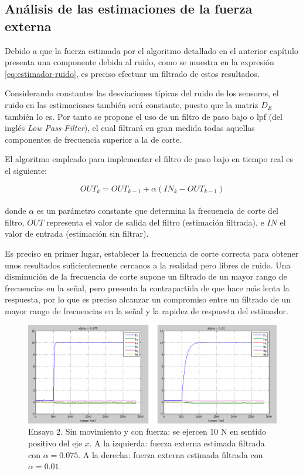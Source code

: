 \subsection{Análisis de las estimaciones de la fuerza externa}

Debido a que la fuerza estimada por el algoritmo detallado en el anterior capítulo presenta una componente debida al ruido, como se muestra en la expresión \ref{eq:estimador-ruido}, es preciso efectuar un filtrado de estos resultados. \par 

Considerando constantes las desviaciones típicas del ruido de los sensores, el ruido en las estimaciones también será constante, puesto que la matriz $D_E$ también lo es. Por tanto se propone el uso de un filtro de paso bajo o \acrshort{lpf} (del inglés \emph{Low Pass Filter}), el cual filtrará en gran medida todas aquellas componentes de frecuencia superior a la de corte. \par 

\noindent
El algoritmo empleado para implementar el filtro de paso bajo en tiempo real es el siguiente:

\begin{equation}
	OUT_k = OUT_{k-1} + \alpha(IN_k - OUT_{k-1})
\end{equation} \\
\noindent
donde $\alpha$ es un parámetro constante que determina la frecuencia de corte del filtro, $OUT$ representa el valor de salida del filtro (estimación filtrada), e $IN$ el valor de entrada (estimación sin filtrar). \par 

Es preciso en primer lugar, establecer la frecuencia de corte correcta para obtener unos resultados suficientemente cercanos a la realidad pero libres de ruido. Una disminución de la frecuencia de corte supone un filtrado de un mayor rango de frecuencias en la señal, pero presenta la contrapartida de que hace más lenta la respuesta, por lo que es preciso alcanzar un compromiso entre un filtrado de un mayor rango de frecuencias en la señal y la rapidez de respuesta del estimador. \par 

\begin{figure}[h!]
\centering
\includegraphics[scale=0.4]{Figuras/compfiltros}
\caption[Ensayo 2. Fuerza estimada sin movimiento y con fuerza]{Ensayo 2. Sin movimiento y con fuerza: se ejercen 10 N en sentido positivo del eje $x$. A la izquierda: fuerza externa estimada filtrada con $\alpha = 0.075$. A la derecha: fuerza externa estimada filtrada con $\alpha = 0.01$.}
\label{fig:compfiltros}
\end{figure}

